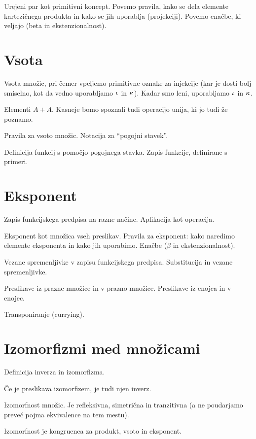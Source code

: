 Urejeni par kot primitivni koncept. Povemo pravila, kako se dela elemente kartezičnega
produkta in kako se jih uporablja (projekciji). Povemo enačbe, ki veljajo (beta in
ekstenzionalnost).

\section{Vsota}
\label{sec:vsota}

Vsota množic, pri čemer vpeljemo primitivne oznake za injekcije (kar je dosti bolj
smiselno, kot da vedno uporabljamo $\inl$ in $\inr$). Kadar smo leni, uporabljamo $\inl$
in $\inr$.

Elementi $A + A$. Kasneje bomo spoznali tudi operacijo unija, ki jo tudi že poznamo.

Pravila za vsoto množic. Notacija za ``pogojni stavek''.

Definicija funkcij s pomočjo pogojnega stavka. Zapis funkcije, definirane s primeri.

\section{Eksponent}
\label{sec:eksponent}

Zapis funkcijskega predpisa na razne načine. Aplikacija kot operacija.

Eksponent kot množica vseh preslikav. Pravila za eksponent: kako naredimo elemente
eksponenta in kako jih uporabimo. Enačbe ($\beta$ in ekstenzionalnost).

Vezane spremenljivke v zapisu funkcijskega predpisa. Substitucija in vezane spremenljivke.

Preslikave iz prazne množice in v prazno množice. Preslikave iz enojca in v enojec.

Transponiranje (currying).


\section{Izomorfizmi med množicami}
\label{sec:izom-med-mnoic}

Definicija inverza in izomorfizma.

Če je preslikava izomorfizem, je tudi njen inverz.

Izomorfnost množic. Je refleksivna, simetrična in tranzitivna (a ne poudarjamo preveč pojma ekvivalence na tem mestu).

Izomorfnost je kongruenca za produkt, vsoto in eksponent.

